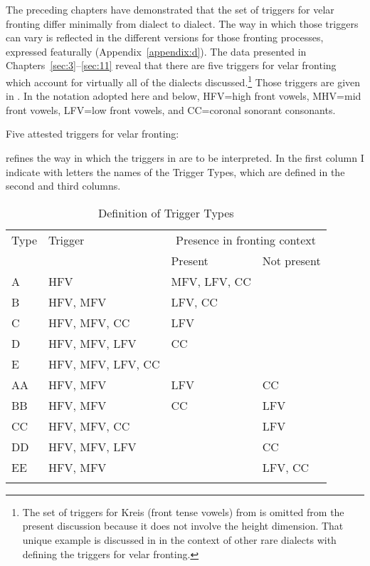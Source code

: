 The preceding chapters have demonstrated that the set of triggers for velar fronting differ minimally from dialect to dialect. The way in which those triggers can vary is reflected in the different versions for those fronting processes, expressed featurally (Appendix~\ref{appendix:d}). The data presented in Chapters~\ref{sec:3}--\ref{sec:11} reveal that there are five triggers for velar fronting which account for virtually all of the dialects discussed.\footnote{{The set of triggers for Kreis  (front tense vowels) from  is omitted from the present discussion because it does not involve the height dimension. That unique example is discussed in  in the context of other rare dialects with  defining the triggers for velar fronting.}} Those triggers are given in . In the notation adopted here and below, HFV=high front vowels, MHV=mid front vowels, LFV=low front vowels, and CC=coronal sonorant consonants.\largerpage[-1]\pagebreak

\ea%
\label{ex:12:1}Five attested triggers for velar fronting:
\begin{multicols}{5}\raggedcolumns
\ea\label{ex:12:1a} \columnbreak
\ex\label{ex:12:1b} \columnbreak
\ex\label{ex:12:1c} \columnbreak
\ex\label{ex:12:1d} \columnbreak
\ex\label{ex:12:1e} 
\z
\end{multicols}
\z

 refines the way in which the triggers in  are to be interpreted. In the first column I indicate with letters the names of the Trigger Types, which are defined in the second and third columns.

\begin{table}
\caption{Definition of Trigger Types\label{tab:12.1}}
\begin{tabular}{llll}
\lsptoprule
Type & Trigger & \multicolumn{2}{c}{Presence in fronting context}\\\cmidrule(lr){3-4}
     &         & Present & Not present\\\midrule
A & HFV & MFV, LFV, CC\\
B & HFV, MFV & LFV, CC\\
C & HFV, MFV, CC & LFV\\
D & HFV, MFV, LFV & CC \\
E & HFV, MFV, LFV, CC & \\
AA & HFV, MFV & LFV & CC\\
BB & HFV, MFV & CC & LFV\\
CC & HFV, MFV, CC &  & LFV\\
DD & HFV, MFV, LFV &  & CC\\
EE & HFV, MFV &  & LFV, CC\\
\lspbottomrule
\end{tabular}
\end{table}


